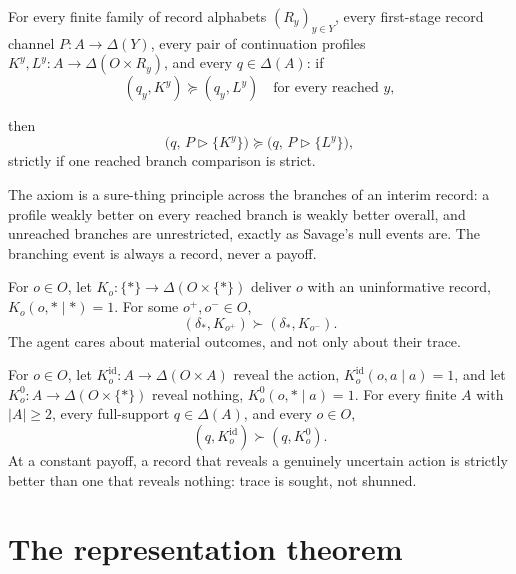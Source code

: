 \documentclass[11pt,a4paper]{article}
\theoremstyle{definition}
\newcommand{\D}{\Delta}
\newcommand{\1}{\mathbf 1}
\begin{document}
\begin{description}[leftmargin=*,style=sameline]

\item[(A6) Branchwise continuation consistency.]
\label{ax:branch-consistency}
For every finite family of record alphabets $(R_y)_{y\in Y}$, every first-stage record channel
$P:A\to\D(Y)$, every pair of continuation profiles $K^y,L^y:A\to\D(O\times R_y)$, and every $q\in\D(A)$: if
\[
 (q_y,K^y)\succeq(q_y,L^y)
 \quad\text{for every reached }y,
\]
\begin{samepage}then
\[
 \bigl(q,\,P\triangleright\{K^y\}\bigr)\succeq\bigl(q,\,P\triangleright\{L^y\}\bigr),
\]
strictly if one reached branch comparison is strict.\end{samepage}

The axiom is a sure-thing principle across the branches of an interim record: a profile weakly better on every
reached branch is weakly better overall, and unreached branches are unrestricted, exactly as Savage's null
events are.  The branching event is always a record, never a payoff.

\item[(A7) Material relevance.]
\label{ax:material-relevance}
For $o\in O$, let $K_o:\{\ast\}\to\D(O\times\{\ast\})$ deliver $o$ with an uninformative record,
$K_o(o,\ast\mid\ast)=1$.  For some $o^+,o^-\in O$,
\[
 (\delta_\ast,K_{o^+})\succ(\delta_\ast,K_{o^-}).
\]
The agent cares about material outcomes, and not only about their trace.

\item[(A8) Positive trace orientation.]
\label{ax:positive-trace}
For $o\in O$, let $K^{\mathrm{id}}_o:A\to\D(O\times A)$ reveal the action, $K^{\mathrm{id}}_o(o,a\mid a)=1$, and
let $K^0_o:A\to\D(O\times\{\ast\})$ reveal nothing, $K^0_o(o,\ast\mid a)=1$.  For every finite $A$ with
$|A|\ge2$, every full-support $q\in\D(A)$, and every $o\in O$,
\[
 (q,K^{\mathrm{id}}_o)\succ(q,K^{0}_o).
\]
At a constant payoff, a record that reveals a genuinely uncertain action is strictly better than one that reveals
nothing: trace is sought, not shunned.

\end{description}

\section{The representation theorem}\label{sec:theorem}
\end{document}
